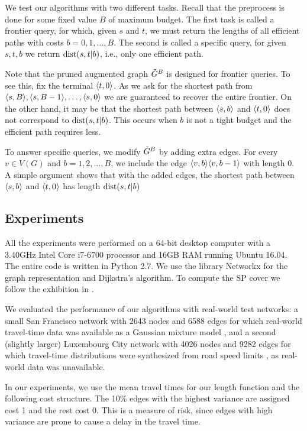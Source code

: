 We test our algorithms with two different tasks.
Recall that the preprocess is done for some fixed value $B$ of maximum budget.
The first task is called a frontier query, for which, given $s$ and $t$, we must return the lengths of all efficient paths with costs $b=0,1,\ldots,B$.
The second is called a specific query, for given $s,t,b$ we return $\text{dist}(s,t|b)$, i.e., only one efficient path.

Note that the pruned augmented graph $\tilde G^B$ is designed for frontier queries.
To see this, fix the terminal $\langle t,0\rangle$.
As we ask for the shortest path from $\langle s,B\rangle,\langle s,B-1\rangle,\ldots,\langle s,0\rangle$ we are guaranteed to recover the entire frontier.
On the other hand, it may be that the shortest path between $\langle s,b\rangle$ and $\langle t,0\rangle$ does not correspond to $\text{dist}(s,t|b)$.
This occurs when $b$ is not a tight budget and the efficient path requires less.

To answer specific queries, we modify $\tilde G^B$ by adding extra edges.
For every $v\in V(G)$ and $b=1,2,\ldots,B$, we include the edge $\langle v,b\rangle\langle v,b-1\rangle$ with length $0$.
A simple argument shows that with the added edges, the shortest path between $\langle s,b\rangle$ and $\langle t,0\rangle$ has length $\text{dist}(s,t|b)$

\subsection{Experiments}
All the experiments were performed on a 64-bit desktop computer with a 3.40GHz Intel Core i7-6700 processor and 16GB RAM running Ubuntu 16.04.
The entire code is written in Python 2.7. We use the library Networkx for the graph representation and Dijkstra's algorithm.
To compute the SP cover we follow the exhibition in \cite{hubimplem}.

We evaluated the performance of our algorithms with real-world test networks: a small San Francisco network with 2643 nodes and 6588 edges for which real-world travel-time data was available as a Gaussian mixture model \cite{sf_data}, and a second (slightly larger) Luxembourg City network with 4026 nodes and 9282 edges for which travel-time distributions were synthesized from road speed limits \cite{niknami2016tractable}, as real-world data was unavailable.
 
In our experiments, we use the mean travel times for our length function and the following cost structure. The 10\% edges with the highest variance are assigned cost 1 and the rest cost 0.
This is a measure of risk, since edges with high variance are prone to cause a delay in the travel time.

